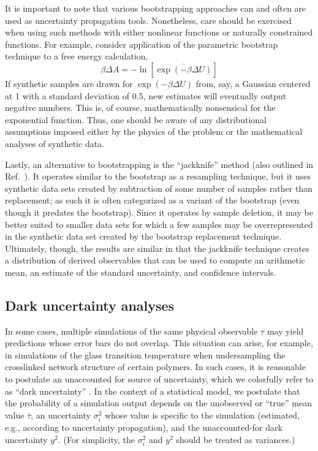 It is important to note that various bootstrapping approaches can and often are used as uncertainty propagation tools.  Nonetheless, care should be exercised when using such methods with either nonlinear functions or naturally constrained functions.  For example, consider application of the parametric bootstrap technique to a free energy calculation,
%
\begin{equation}
  \beta \Delta A = - \ln \left[ \overline{\exp\left(-\beta \Delta U\right)} \right]
\end{equation}
%
If synthetic samples are drawn for $\exp(-\beta \Delta U)$ from, say, a Gaussian centered at 1 with a standard deviation of 0.5, new estimates will eventually output negative numbers. This is, of course, mathematically nonsensical for the exponential function.  Thus, one should be aware of any distributional assumptions imposed either by the physics of the problem or the mathematical analyses of synthetic data.

Lastly, an alternative to bootstrapping is the ``jackknife'' method \cite{Quenouille_Approximate_1949,Quenouille_Notes_1956,Tukey_Bias_1958} (also outlined in Ref.~\cite{Tibshirani1998}). It operates similar to the bootstrap as a resampling technique, but it uses synthetic data sets created by subtraction of some number of samples rather than replacement; as such it is often categorized as a variant of the bootstrap (even though it predates the bootstrap). Since it operates by sample deletion, it may be better suited to smaller data sets for which a few samples may be overrepresented in the synthetic data set created by the bootstrap replacement technique. Ultimately, though, the results are similar in that the jackknife technique creates a distribution of derived observables that can be used to compute an arithmetic mean, an estimate of the standard uncertainty, and confidence intervals.

\subsection{Dark uncertainty analyses}

In some cases, multiple simulations of the same physical observable $\tau$ may yield predictions whose error bars do not overlap.  This situation can arise, for example, in simulations of the glass transition temperature when undersampling the crosslinked network structure of certain polymers.  In such cases, it is reasonable to postulate an unaccounted for source of uncertainty, which we colorfully refer to as ``dark uncertainty'' \cite{patrone1}.  In the context of a statistical model, we postulate that the probability of a simulation output depends on the unobserved or ``true'' mean value $\bar \tau$, an uncertainty $\sigma_i^2$ whose value is specific to the simulation (estimated, e.g., according to uncertainty propagation), and the unaccounted-for dark uncertainty $y^2$.  (For simplicity, the $\sigma_i^2$ and $y^2$ should be treated as variances.)

